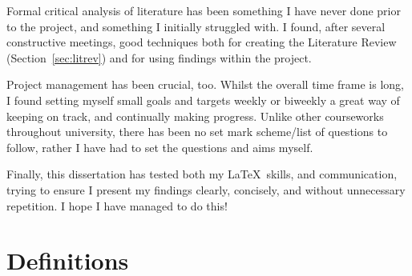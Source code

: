 \documentclass[a4paper,10pt]{report}
\begin{document}
Formal critical analysis of literature has been something I have never done prior to the project, and something I initially struggled with. I found, after several constructive meetings, good techniques both for creating the Literature Review (Section~\ref{sec:litrev}) and for using findings within the project.

Project management has been crucial, too. Whilst the overall time frame is long, I found setting myself small goals and targets weekly or biweekly a great way of keeping on track, and continually making progress. Unlike other courseworks throughout university, there has been no set mark scheme/list of questions to follow, rather I have had to set the questions and aims myself.

Finally, this dissertation has tested both my \LaTeX\ skills, and communication, trying to ensure I present my findings clearly, concisely, and without unnecessary repetition. I hope I have managed to do this!



\pagebreak
\printbibliography
\appendix
\appendixpage

\chapter{Definitions}\label{app:definitions} 
\end{document}
